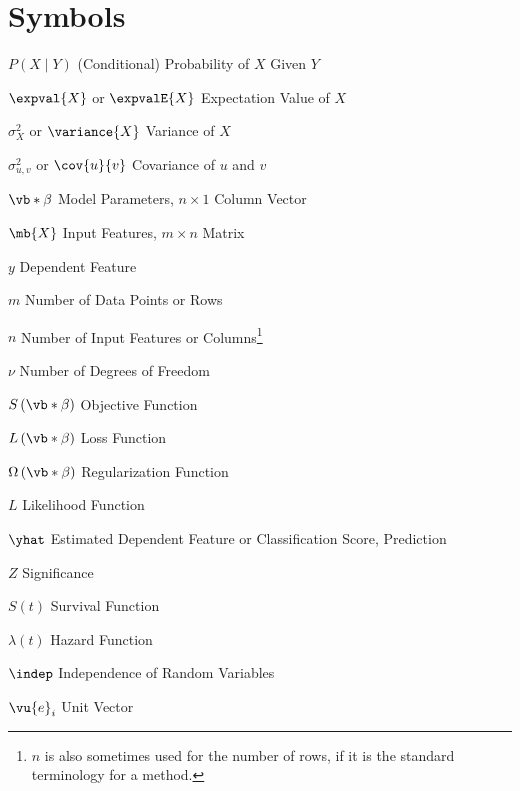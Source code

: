 \abbreviations

\section*{Symbols}

\begin{symbollist}
  \item[$P\left(X \mid Y\right)$] (Conditional) Probability of $X$ Given $Y$
  \item[$\expval{X}$ or $\expvalE{X}$] Expectation Value of $X$
  \item[$\sigma_{X}^{2}$ or $\variance{X}$] Variance of $X$
  \item[$\sigma_{u,v}^{2}$ or $\cov{u}{v}$] Covariance of $u$ and $v$
  \item[$\vb*{\beta}$] Model Parameters, $n \times 1$ Column Vector
  \item[$\mb{X}$] Input Features, $m \times n$ Matrix
  \item[$y$] Dependent Feature
  \item[$m$] Number of Data Points or Rows
  \item[$n$] Number of Input Features or Columns\footnote{$n$ is also sometimes used for the number of rows, if it is the standard terminology for a method.}
  \item[$\nu$] Number of Degrees of Freedom
  \item[$S\left(\vb*{\beta}\right)$] Objective Function
  \item[$L\left(\vb*{\beta}\right)$] Loss Function
  \item[$\Omega\left(\vb*{\beta}\right)$] Regularization Function
  \item[$L$] Likelihood Function
  \item[$\yhat$] Estimated Dependent Feature or Classification Score, Prediction %
  \item[$Z$] Significance
  \item[$S\left(t\right)$] Survival Function
  \item[$\lambda\left(t\right)$] Hazard Function
  \item[$\indep$] Independence of Random Variables %
  \item[$\vu{e}_{i}$] Unit Vector
\end{symbollist}

